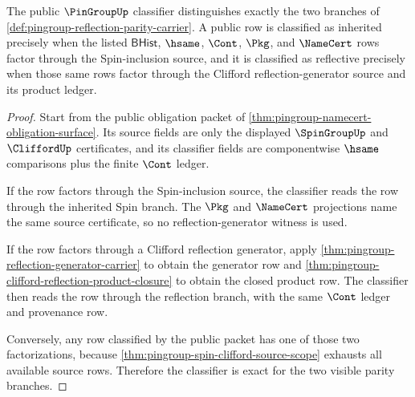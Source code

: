 \begin{theorem}
\label{thm:pingroup-reflection-parity-exactness}
The public $\PinGroupUp$ classifier distinguishes exactly the two branches of
\autoref{def:pingroup-reflection-parity-carrier}. A public row is classified
as inherited precisely when the listed $\mathsf{BHist}$, $\hsame$, $\Cont$,
$\Pkg$, and $\NameCert$ rows factor through the Spin-inclusion source, and it
is classified as reflective precisely when those same rows factor through the
Clifford reflection-generator source and its product ledger.
\end{theorem}
\begin{proof}
Start from the public obligation packet of
\autoref{thm:pingroup-namecert-obligation-surface}. Its source fields are
only the displayed $\SpinGroupUp$ and $\CliffordUp$ certificates, and its
classifier fields are componentwise $\hsame$ comparisons plus the finite
$\Cont$ ledger.

If the row factors through the Spin-inclusion source, the classifier reads the
row through the inherited Spin branch. The $\Pkg$ and $\NameCert$ projections
name the same source certificate, so no reflection-generator witness is used.

If the row factors through a Clifford reflection generator, apply
\autoref{thm:pingroup-reflection-generator-carrier} to obtain the generator
row and \autoref{thm:pingroup-clifford-reflection-product-closure} to obtain
the closed product row. The classifier then reads the row through the
reflection branch, with the same $\Cont$ ledger and provenance row.

Conversely, any row classified by the public packet has one of those two
factorizations, because \autoref{thm:pingroup-spin-clifford-source-scope}
exhausts all available source rows. Therefore the classifier is exact for the
two visible parity branches.
\end{proof}

